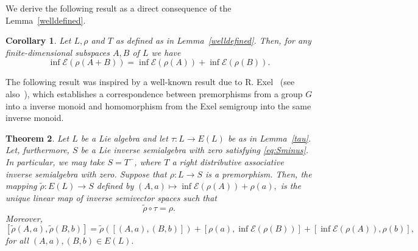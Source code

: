 \documentclass[10pt,a4paper]{amsart}
\newtheorem{thm}{Theorem}[section]
\newtheorem{cor}[thm]{Corollary}
\theoremstyle{definition}
\theoremstyle{remark}
\numberwithin{equation}{section}
\newtheorem*{Theorem A}{\textbf{Theorem A}}
\newtheorem*{Corollary E}{\textbf{Corollary E}}
\newtheorem*{Corollary F}{\textbf{Corollary F}}
\newtheorem*{Theorem B}{\textbf{Theorem B}}
\newtheorem*{Theorem C}{\textbf{Theorem C}}
\newtheorem*{Theorem D}{\textbf{Theorem B}}
\newtheorem*{p a}{\textbf{Proof of  Theorem A}}
\newtheorem*{p b}{\textbf{Proof of Theorem B}}
\newtheorem*{p c}{\textbf{Proof of  Theorem C}}
\newtheorem*{p d}{\textbf{Proof of  Theorem D}}
\newcommand{\E}{\mathcal{E}}
\newcommand{\0}{{\vartheta}}
\begin{document}
We derive the following result as a direct  consequence of the Lemma~\ref{welldefined}.

\begin{cor}\label{cor:infErho}
Let $L,\rho$ and $T$ as defined as in Lemma~\ref{welldefined}. Then, for any finite-dimensional subspaces  $A,B$  of $L$ we have 
$$\inf\E(\rho(A+B))=\inf\E(\rho(A))+\inf\E(\rho(B)).$$
\end{cor}

The following result was inspired by a well-known result due to R. Exel~\cite[Proposition 2.2]{Exel1998} (see also~\cite[Theorem 2.4]{KL}), which establishes  a correspondence between premorphisms from a group $G$ into a inverse monoid and homomorphism from the Exel semigroup into the same inverse monoid. 


\begin{thm}\label{prouniq}
Let $L$ be a Lie algebra and let $\tau:L \rightarrow E(L)$ be as in Lemma~\ref{tau}. Let, furthermore, $S$ be a Lie inverse semialgebra with zero satisfying \eqref{eq:Sminus}. In particular, we may take $S=T^{-}$, where $T$ a right distributive associative inverse semialgebra with zero.  Suppose that $\rho :L \rightarrow S$ is a premorphism. Then,  the mapping $\widetilde{\rho}:E(L) \rightarrow S$ defined by $(A,a)\mapsto \inf\E(\rho(A))+\rho (a),$ is the unique linear map of inverse semivector spaces such that
\begin{equation}\label{eq:unique}
\widetilde{\rho} \circ \tau =\rho .
\end{equation} Moreover,  
\begin{equation}\label{eq:moreover}
[\widetilde{\rho}(A,a),\widetilde{\rho}(B,b)]=\widetilde{\rho} ([(A,a),(B,b)]) +[\rho (a),\inf\E(\rho(B)) ]+ [\inf\E(\rho(A)), \rho(b)],
\end{equation}
 for all $(A,a),(B,b)\in E(L).$ 
\end{thm}
\end{document}
